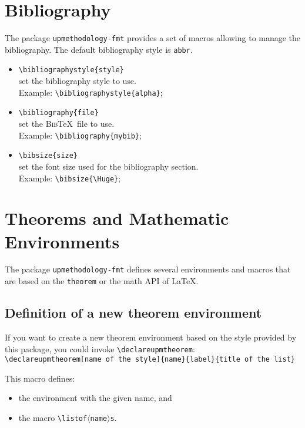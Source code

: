 \documentclass[book]{upmethodology-document}
\begin{document}
\section{Bibliography}

The package \texttt{upmethodology-fmt} provides a set of macros allowing to manage the bibliography. The default bibliography style is \texttt{abbr}.

\begin{itemize}
\item \texttt{{\textbackslash}bibliographystyle\{style\}} \\
	set the bibliography style to use. \\
	Example: \texttt{{\textbackslash}bibliographystyle\{alpha\}};
\item \texttt{{\textbackslash}bibliography\{file\}} \\
	set the \textsc{Bib}\TeX\ file to use. \\
	Example: \texttt{{\textbackslash}bibliography\{mybib\}};
\item \texttt{{\textbackslash}bibsize\{size\}} \\
	set the font size used for the bibliography section. \\
	Example: \texttt{{\textbackslash}bibsize\{{\textbackslash}Huge\}};
\end{itemize}

\section{Theorems and Mathematic Environments}

The package \texttt{upmethodology-fmt} defines several environments and macros that are based on the \texttt{theorem} or the math API of \LaTeX.

\subsection{Definition of a new theorem environment}

If you want to create a new theorem environment based on the style provided by this package, you could invoke \texttt{{\textbackslash}declareupmtheorem}: \\
\texttt{{\textbackslash}declareupmtheorem[name of the style]\{name\}\{label\}\{title of the list\}}

This macro defines:
\begin{itemize}
\item the environment with the given name, and
\item the macro \texttt{{\textbackslash}listof$\langle$name$\rangle$s}.
\end{itemize}
\end{document}
